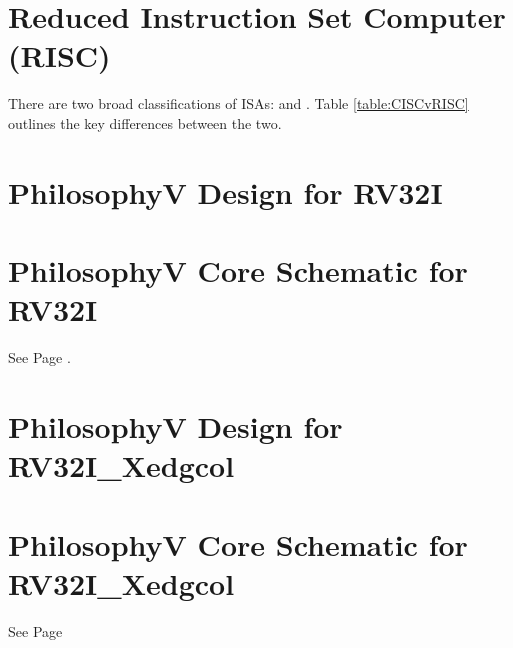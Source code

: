 
\section{Reduced Instruction Set Computer (RISC)}
\label{section:philv_appendix_RISC}
    There are two broad classifications of \glspl{ISA}:  and . Table \ref{table:CISCvRISC} outlines the key differences between the two.

    

\section{PhilosophyV Design for RV32I}

\section{PhilosophyV Core Schematic for RV32I}
\label{section:philv_appendix_rv32i_core}
See Page \pageref{fig:philv-core}.

\section{PhilosophyV Design for RV32I\_Xedgcol}

\section{PhilosophyV Core Schematic for RV32I\_Xedgcol}
\label{section:philv_appendix_rv32i_xedgcol_core}
See Page %

\newpage
 
\thispagestyle{empty}
\newpage



\newpage
 
\thispagestyle{empty}
\newpage